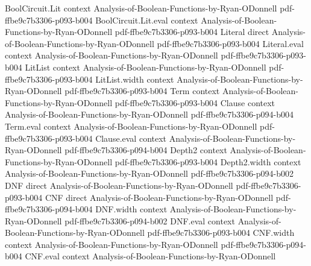 \begin{lemma}
\label{ArrowTheorem.expected_product_bcca}
\leanok
{}
\proofstep
  {BoolCircuit.Lit}
  {context}
  {Analysis-of-Boolean-Functions-by-Ryan-ODonnell}
  {pdf-ffbe9c7b3306-p093-b004}
\proofstep
  {BoolCircuit.Lit.eval}
  {context}
  {Analysis-of-Boolean-Functions-by-Ryan-ODonnell}
  {pdf-ffbe9c7b3306-p093-b004}
\proofstep
  {Literal}
  {direct}
  {Analysis-of-Boolean-Functions-by-Ryan-ODonnell}
  {pdf-ffbe9c7b3306-p093-b004}
\proofstep
  {Literal.eval}
  {context}
  {Analysis-of-Boolean-Functions-by-Ryan-ODonnell}
  {pdf-ffbe9c7b3306-p093-b004}
\proofstep
  {LitList}
  {context}
  {Analysis-of-Boolean-Functions-by-Ryan-ODonnell}
  {pdf-ffbe9c7b3306-p093-b004}
\proofstep
  {LitList.width}
  {context}
  {Analysis-of-Boolean-Functions-by-Ryan-ODonnell}
  {pdf-ffbe9c7b3306-p093-b004}
\proofstep
  {Term}
  {context}
  {Analysis-of-Boolean-Functions-by-Ryan-ODonnell}
  {pdf-ffbe9c7b3306-p093-b004}
\proofstep
  {Clause}
  {context}
  {Analysis-of-Boolean-Functions-by-Ryan-ODonnell}
  {pdf-ffbe9c7b3306-p094-b004}
\proofstep
  {Term.eval}
  {context}
  {Analysis-of-Boolean-Functions-by-Ryan-ODonnell}
  {pdf-ffbe9c7b3306-p093-b004}
\proofstep
  {Clause.eval}
  {context}
  {Analysis-of-Boolean-Functions-by-Ryan-ODonnell}
  {pdf-ffbe9c7b3306-p094-b004}
\proofstep
  {Depth2}
  {context}
  {Analysis-of-Boolean-Functions-by-Ryan-ODonnell}
  {pdf-ffbe9c7b3306-p093-b004}
\proofstep
  {Depth2.width}
  {context}
  {Analysis-of-Boolean-Functions-by-Ryan-ODonnell}
  {pdf-ffbe9c7b3306-p094-b002}
\proofstep
  {DNF}
  {direct}
  {Analysis-of-Boolean-Functions-by-Ryan-ODonnell}
  {pdf-ffbe9c7b3306-p093-b004}
\proofstep
  {CNF}
  {direct}
  {Analysis-of-Boolean-Functions-by-Ryan-ODonnell}
  {pdf-ffbe9c7b3306-p094-b004}
\proofstep
  {DNF.width}
  {context}
  {Analysis-of-Boolean-Functions-by-Ryan-ODonnell}
  {pdf-ffbe9c7b3306-p094-b002}
\proofstep
  {DNF.eval}
  {context}
  {Analysis-of-Boolean-Functions-by-Ryan-ODonnell}
  {pdf-ffbe9c7b3306-p093-b004}
\proofstep
  {CNF.width}
  {context}
  {Analysis-of-Boolean-Functions-by-Ryan-ODonnell}
  {pdf-ffbe9c7b3306-p094-b004}
\proofstep
  {CNF.eval}
  {context}
  {Analysis-of-Boolean-Functions-by-Ryan-ODonnell}

\end{lemma}
